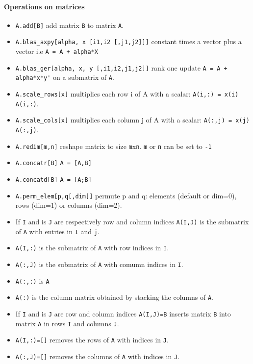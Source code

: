 \paragraph{Operations on matrices}
\begin{itemize}
\item \verb+A.add[B]+  add matrix \verb+B+ to matrix \verb+A+.
\item \verb+A.blas_axpy[alpha, x [i1,i2 [,j1,j2]]]+ constant times a vector plus a vector i.e \verb!A = A + alpha*X!
\item \verb+A.blas_ger[alpha, x, y [,i1,i2,j1,j2]]+  rank one update \verb!A = A + alpha*x*y'!
  on a submatrix of \verb+A+.
\item \verb+A.scale_rows[x]+ multiplies each row i of A with a scalar:
  \verb+A(i,:) = x(i) A(i,:)+. %
\item \verb+A.scale_cols[x]+ multiplies each column j of A with a scalar:
  \verb+A(:,j) = x(j) A(:,j)+. %
\end{itemize}
\begin{itemize}
\item \verb+A.redim[m,n]+ reshape matrix to size \verb+m+x\verb+n+. \verb+m+ or \verb+n+ can be set to \verb+-1+ 
\item \verb+A.concatr[B]+ \verb+A = [A,B]+
\item \verb+A.concatd[B]+ \verb+A = [A;B]+
\item \verb+A.perm_elem[p,q[,dim]]+ permute p and q: elements
  (default or dim=0), rows (dim=1) or columns (dim=2).
\end{itemize}

\begin{itemize}
   \item If \verb+I+ and is \verb+J+ are respectively row and column indices \verb+A(I,J)+ is the submatrix of \verb+A+ with entries in \verb+I+ and \verb+j+.
   \item \verb+A(I,:)+ is the submatrix of \verb+A+ with row indices in \verb+I+.
   \item \verb+A(:,J)+ is the submatrix of \verb+A+ with comumn indices in \verb+I+.
   \item \verb+A(:,:)+ is \verb+A+
   \item \verb+A(:)+  is the column matrix obtained by stacking the columns of \verb+A+.
\end{itemize}
\begin{itemize}
   \item If \verb+I+ and is \verb+J+ are row and column indices \verb+A(I,J)=B+ inserts
matrix \verb+B+ into matrix \verb+A+ in rows \verb+I+ and columns \verb!J!.
   \item \verb+A(I,:)=[]+ removes the rows of \verb+A+ with indices in \verb+J+.
   \item \verb+A(:,J)=[]+ removes the columns of \verb+A+ with indices in \verb+J+.
\end{itemize}

